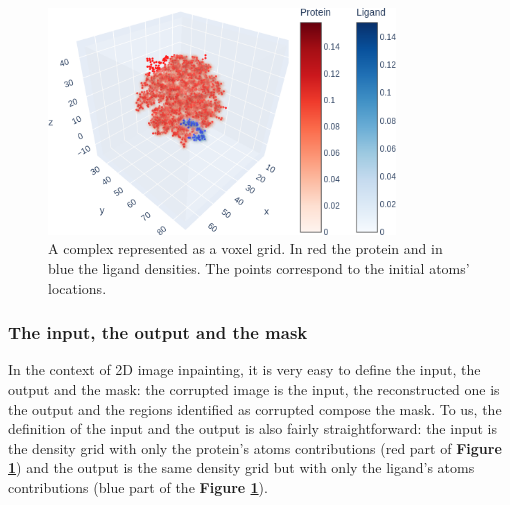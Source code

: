 \documentclass{article}
\begin{document}
\begin{figure}[H]
    \centering
    \includegraphics[height=6cm,width=\textwidth,keepaspectratio]{complex_grid.png}
    \caption{A complex represented as a voxel grid. In red the protein and in blue the ligand densities. The points correspond to the initial atoms' locations.}
    \label{fig:complex_grid}
\end{figure}

\subsubsection{The input, the output and the mask}
\label{sec:input_output_mask}

In the context of 2D image inpainting, it is very easy to define the input, the output and the mask: the corrupted image is the input, the reconstructed one is the output and the regions identified as corrupted compose the mask. To us, the definition of the input and the output is also fairly straightforward: the input is the density grid with only the protein's atoms contributions (red part of \textbf{Figure \ref{fig:complex_grid}}) and the output is the same density grid but with only the ligand's atoms contributions (blue part of the \textbf{Figure \ref{fig:complex_grid}}). \\
\end{document}
